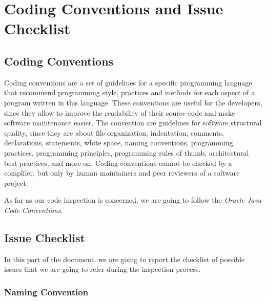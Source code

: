 \section{Coding Conventions and Issue Checklist} \label{sec:code}

\subsection{Coding Conventions}
Coding conventions are a set of guidelines for a specific programming language that recommend programming style, practices and methods for each aspect of
a program written in this language. These conventions are useful for the developers, since they allow to improve the readability of their source code and make software maintenance easier. The convention are guidelines for software structural quality, since they are about file organization, indentation, comments, declarations, statements, white space, naming conventions, programming practices, programming principles, programming rules of thumb, architectural best practices, and more on. 
Coding conventions cannot be checked by a compliler, but only by human maintainers and peer reviewers of a software project. 
\newline

As far as our code inspection is concerned, we are going to follow the \textit{Oracle Java Code Conventions}.

\subsection{Issue Checklist}
In this part of the document, we are going to report the checklist of possible issues that we are going to refer during the inspection process.

\subsubsection{Naming Convention} \label{sssec:naming}

